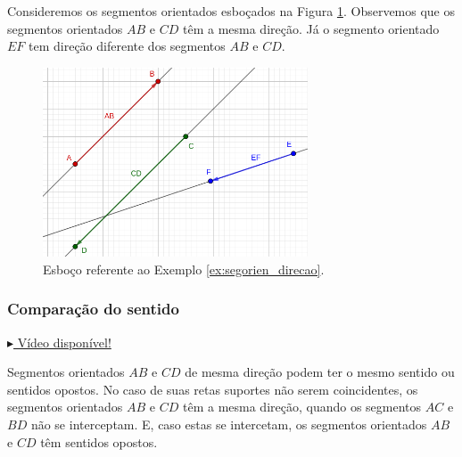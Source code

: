 \begin{ex}\label{ex:segorien_direcao}
  Consideremos os segmentos orientados esboçados na Figura \ref{fig:ex_segorien_direcao}. Observemos que os segmentos orientados $AB$ e $CD$ têm a mesma direção. Já o segmento orientado $EF$ tem direção diferente dos segmentos $AB$ e $CD$.
  
  \begin{figure}[H]
    \centering
    \includegraphics[width=0.7\textwidth]{./cap_vetor/dados/fig_ex_segorien_direcao/fig_ex_segorien_direcao}
  \caption{Esboço referente ao Exemplo \ref{ex:segorien_direcao}.}
  \label{fig:ex_segorien_direcao}
\end{figure}  
\end{ex}

\subsubsection{Comparação do sentido}

\begin{flushright}
  \href{https://archive.org/details/comparacao-sentido-segmentos-orientados}{$\blacktriangleright$ Vídeo disponível!}
\end{flushright}

Segmentos orientados $AB$ e $CD$ de mesma direção podem ter o mesmo sentido ou sentidos opostos. No caso de suas retas suportes não serem coincidentes, os segmentos orientados $AB$ e $CD$ têm a mesma direção, quando os segmentos $AC$ e $BD$ não se interceptam. E, caso estas se intercetam, os segmentos orientados $AB$ e $CD$ têm sentidos opostos. 

